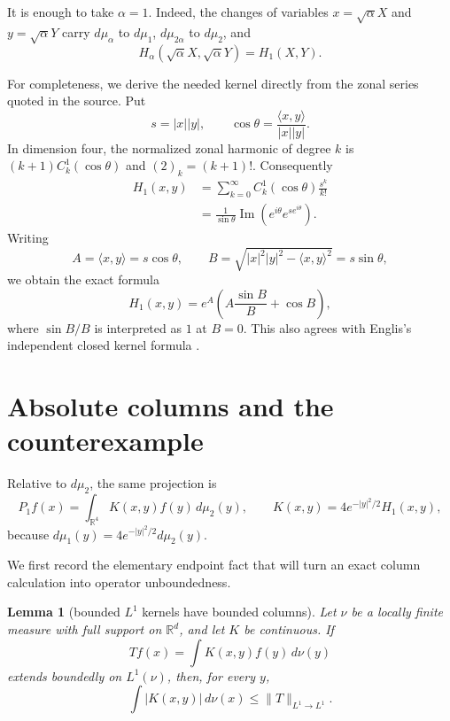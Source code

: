 \documentclass[11pt]{article}
\newtheorem{lemma}{Lemma}
\newcommand{\R}{\mathbb R}
\newcommand{\dd}{\,d}
\begin{document}
It is enough to take $\alpha=1$.  Indeed, the changes of variables
$x=\sqrt\alpha X$ and $y=\sqrt\alpha Y$ carry $d\mu_\alpha$ to
$d\mu_1$, $d\mu_{2\alpha}$ to $d\mu_2$, and
\[
 H_\alpha(\sqrt\alpha X,\sqrt\alpha Y)=H_1(X,Y).
\]

For completeness, we derive the needed kernel directly from the zonal
series quoted in the source.  Put
\[
 s=|x||y|,\qquad \cos\theta=\frac{\langle x,y\rangle}{|x||y|}.
\]
In dimension four, the normalized zonal harmonic of degree $k$ is
$(k+1)C_k^1(\cos\theta)$ and $(2)_k=(k+1)!$.  Consequently
\begin{align*}
 H_1(x,y)
 &=\sum_{k=0}^\infty C_k^1(\cos\theta)\frac{s^k}{k!}\\
 &=\frac1{\sin\theta}\operatorname{Im}
     \left(e^{i\theta}e^{se^{i\theta}}\right).
\end{align*}
Writing
\[
 A=\langle x,y\rangle=s\cos\theta,
 \qquad
 B=\sqrt{|x|^2|y|^2-\langle x,y\rangle^2}=s\sin\theta,
\]
we obtain the exact formula
\begin{equation}\label{kernel}
 \boxed{\quad
 H_1(x,y)=e^A\left(A\frac{\sin B}{B}+\cos B\right),
 \quad}
\end{equation}
where $\sin B/B$ is interpreted as $1$ at $B=0$.  This also agrees with
Englis's independent closed kernel formula \cite[Corollary 7]{Englis}.

\section{Absolute columns and the counterexample}

Relative to $d\mu_2$, the same projection is
\begin{equation}\label{relative-kernel}
 P_1f(x)=\int_{\R^4}K(x,y)f(y)\dd\mu_2(y),
 \qquad K(x,y)=4e^{-|y|^2/2}H_1(x,y),
\end{equation}
because $d\mu_1(y)=4e^{-|y|^2/2}d\mu_2(y)$.

We first record the elementary endpoint fact that will turn an exact column
calculation into operator unboundedness.

\begin{lemma}[bounded $L^1$ kernels have bounded columns]\label{column-lemma}
Let $\nu$ be a locally finite measure with full support on $\R^d$, and let
$K$ be continuous.  If
\[
 Tf(x)=\int K(x,y)f(y)\dd\nu(y)
\]
extends boundedly on $L^1(\nu)$, then, for every $y$,
\[
 \int |K(x,y)|\dd\nu(x)\le \|T\|_{L^1\to L^1}.
\]
\end{lemma}
\end{document}
